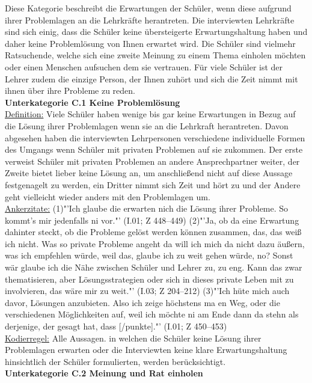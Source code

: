 Diese Kategorie beschreibt die Erwartungen der Schüler, wenn diese aufgrund ihrer Problemlagen an die Lehrkräfte herantreten. Die interviewten Lehrkräfte sind sich einig, dass die Schüler keine übersteigerte Erwartungshaltung haben und daher keine Problemlösung von Ihnen erwartet wird. Die Schüler sind vielmehr Ratsuchende, welche sich eine zweite Meinung zu einem Thema einholen möchten oder einen Menschen aufsuchen dem sie vertrauen. Für viele Schüler ist der Lehrer zudem die einzige Person, der Ihnen zuhört und sich die Zeit nimmt mit ihnen über ihre Probleme zu reden.\\
\textbf{Unterkategorie C.1 Keine Problemlösung}\\
\underline{Definition:} Viele Schüler haben wenige bis gar keine Erwartungen in Bezug auf die Lösung ihrer Problemlagen wenn sie an die Lehrkraft herantreten. Davon abgesehen haben die interviewten Lehrpersonen verschiedene individuelle Formen des Umgangs wenn Schüler mit privaten Problemen auf sie zukommen. Der erste verweist Schüler mit privaten Problemen an andere Ansprechpartner weiter, der Zweite bietet lieber keine Lösung an, um anschließend nicht auf diese Aussage festgenagelt zu werden, ein Dritter nimmt sich Zeit und hört zu und der Andere geht vielleicht wieder anders mit den Problemlagen um.\\
\underline{Ankerzitate:} (1)"'Ich glaube die erwarten nich die Lösung ihrer Probleme. So kommt’s mir jedenfalls ni vor."' (I.01; Z 448--449) (2)"'Ja, ob da eine Erwartung dahinter steckt, ob die Probleme gelöst werden können zusammen, das, das weiß ich nicht. Was so private Probleme angeht da will ich mich da nicht dazu äußern, was ich empfehlen würde, weil das, glaube ich zu weit gehen würde, no? Sonst wär glaube ich die Nähe zwischen Schüler und Lehrer zu, zu eng. Kann das zwar thematisieren, aber Lösungsstrategien oder sich in dieses private Leben mit zu involvieren, das wäre mir zu weit."' (I.03; Z 204--212) (3)"'Ich hüte mich auch davor, Lösungen anzubieten. Also ich zeige höchstens ma en Weg, oder die verschiedenen Möglichkeiten auf, weil ich möchte ni am Ende dann da stehn als derjenige, der gesagt hat, dass [/punkte]."' (I.01; Z 450--453)\\
\underline{Kodierregel:} Alle Aussagen. in welchen die Schüler keine Lösung ihrer Problemlagen erwarten oder die Interviewten keine klare Erwartungshaltung hinsichtlich der Schüler formulierten, werden berücksichtigt.\\
\textbf{Unterkategorie C.2 Meinung und Rat einholen}\\
